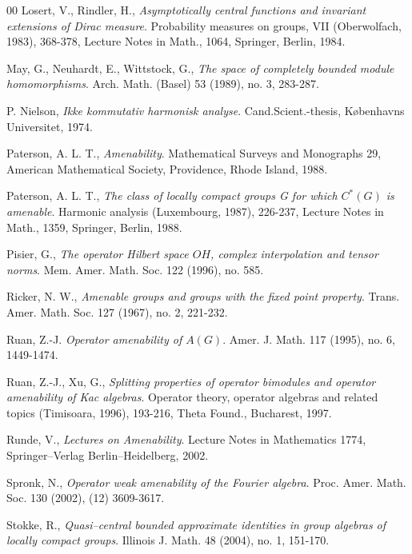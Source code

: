 \documentclass[preprint,12pt]{elsarticle}
\newcommand{\e}[1]{\emph{#1}}
\begin{document}
\begin{thebibliography}{00}
 Losert, V., Rindler, H.,
\e{Asymptotically central functions and invariant extensions of Dirac measure}.
Probability measures on groups, VII (Oberwolfach, 1983), 368-378,
Lecture Notes in Math., 1064, Springer, Berlin, 1984.


 May, G., Neuhardt, E., Wittstock, G.,
\e{The space of completely bounded module homomorphisms}.
Arch. Math. (Basel) 53 (1989), no. 3, 283-287.

 P. Nielson,
\e{Ikke kommutativ harmonisk analyse}.
Cand.Scient.-thesis, K\o benhavns Universitet, 1974.

 Paterson, A. L. T.,
\e{Amenability}.
Mathematical Surveys and Monographs 29, American Mathematical Society, Providence, Rhode Island, 1988.

 Paterson, A. L. T.,
\e{The class of locally compact groups G for which $C^*(G)$ is amenable}.
Harmonic analysis (Luxembourg, 1987), 226-237, Lecture Notes in Math., 1359, Springer, Berlin, 1988.


 Pisier, G.,
\e{The operator Hilbert space $OH$, complex interpolation and tensor norms}.
Mem. Amer. Math. Soc. 122 (1996), no. 585.

 Ricker, N. W.,
\e{Amenable groups and groups with the fixed point property}.
Trans. Amer. Math. Soc. 127 (1967), no. 2, 221-232.


 Ruan, Z.-J.
\e{Operator amenability of $A(G)$}.
Amer. J. Math. 117 (1995), no. 6, 1449-1474.

 Ruan, Z.-J., Xu, G.,
\e{Splitting properties of operator bimodules and operator amenability of Kac algebras}.
Operator theory, operator algebras and related topics (Timisoara, 1996), 193-216, Theta Found., Bucharest, 1997.

 Runde, V.,
\e{Lectures on Amenability}.
Lecture Notes in Mathematics 1774, Springer--Verlag Berlin--Heidelberg, 2002.


 Spronk, N.,
\e{Operator weak amenability of the Fourier algebra}.
Proc. Amer. Math. Soc. 130 (2002), (12) 3609-3617.

 Stokke, R.,
\e{Quasi--central bounded approximate identities in group algebras of locally compact groups}.
Illinois J. Math. 48 (2004), no. 1, 151-170.


\end{thebibliography}
\end{document}
